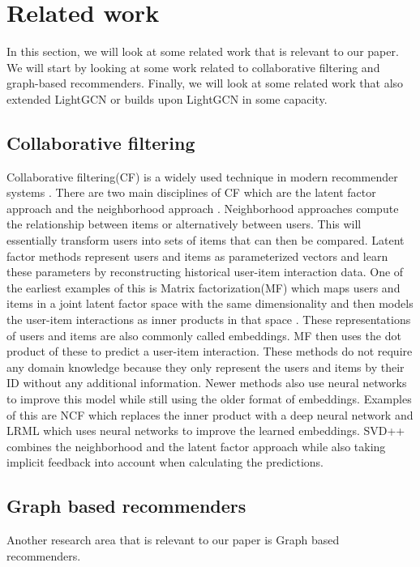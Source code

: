 \section{Related work} 
In this section, we will look at some related work that is relevant to our paper.
We will start by looking at some work related to collaborative filtering and graph-based recommenders.
Finally, we will look at some related work that also extended LightGCN or builds upon LightGCN in some capacity.

\subsection{Collaborative filtering}
Collaborative filtering(CF) is a widely used technique in modern recommender systems \cite{lightgcn}.
There are two main disciplines of CF which are the latent factor approach and the neighborhood approach \cite{SVD}.
Neighborhood approaches compute the relationship between items or alternatively between users.
This will essentially transform users into sets of items that can then be compared.
Latent factor methods represent users and items as parameterized vectors and learn these parameters by reconstructing historical user-item interaction data.
One of the earliest examples of this is Matrix factorization(MF) which maps users and items in a joint latent factor space with the same dimensionality and then models the user-item interactions as inner products in that space \cite{Matrix-factorization-techniques}.
These representations of users and items are also commonly called embeddings.
MF then uses the dot product of these to predict a user-item interaction.
These methods do not require any domain knowledge because they only represent the users and items by their ID without any additional information.
Newer methods also use neural networks to improve this model while still using the older format of embeddings. 
Examples of this are NCF \cite{NCF} which replaces the inner product with a deep neural network and LRML\cite{LRML} which uses neural networks to improve the learned embeddings.
SVD++ \cite{SVD} combines the neighborhood and the latent factor approach while also taking implicit feedback into account when calculating the predictions.

\subsection{Graph based recommenders}
Another research area that is relevant to our paper is Graph based recommenders.

